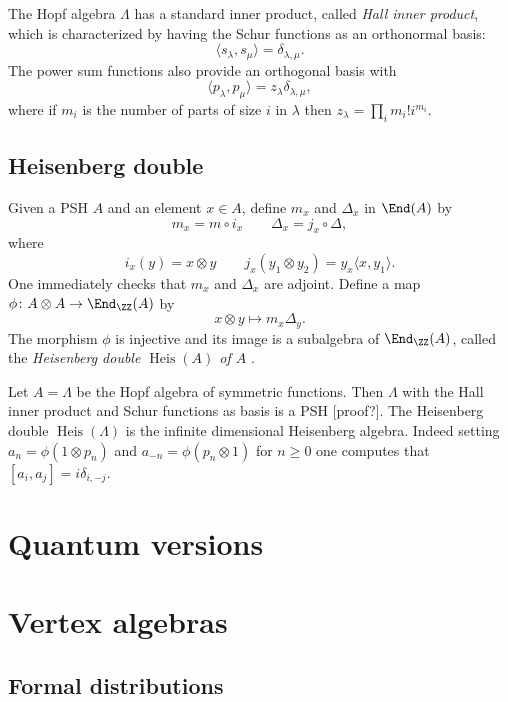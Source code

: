 \documentclass{ck-article}
\DeclareMathOperator\Heis{Heis}
\begin{document}
The Hopf algebra $\Lambda$ has a standard inner product, called \emph{Hall inner product}, which is characterized by having the Schur functions as an orthonormal basis:
\[
    \langle s_\lambda, s_\mu\rangle = \delta_{\lambda,\mu}.
\]
The power sum functions also provide an orthogonal basis with
\[
    \langle p_\lambda, p_\mu\rangle = z_\lambda\delta_{\lambda,\mu},
\]
where if $m_i$ is the number of parts of size $i$ in $\lambda$ then $z_\lambda = \prod_i m_i!i^{m_i}$.

\subsection{Heisenberg double}

Given a PSH $A$ and an element $x \in A$, define $m_x$ and $\Delta_x$ in $\End(A)$ by
\[
    m_x = m \circ i_x \qquad \Delta_x = j_x \circ \Delta,
\]
where
\[
    i_x(y) = x \otimes y \qquad j_x(y_1 \otimes y_2) = y_x \langle x, y_1 \rangle.
\]
One immediately checks that $m_x$ and $\Delta_x$ are adjoint.
Define a map $\phi\colon A \otimes A \to \End_\ZZ(A)$ by
\[
    x \otimes y \mapsto m_x\Delta_y.
\]
The morphism $\phi$ is injective and its image is a subalgebra of $\End_\ZZ(A)$, called the \emph{Heisenberg double $\Heis(A)$ of $A$} \cite[Proposition~5.4]{GalGal:2017:SymmetricSelfajointHopfCategories}.

\begin{Example}
    Let $A = \Lambda$ be the Hopf algebra of symmetric functions.
    Then $\Lambda$ with the Hall inner product and Schur functions as basis is a PSH [proof?].
    The Heisenberg double $\Heis(\Lambda)$ is the infinite dimensional Heisenberg algebra.
    Indeed setting $a_n = \phi(1 \otimes p_n)$ and $a_{-n} = \phi(p_n \otimes 1)$ for $n \ge 0$ one computes that $[a_i, a_j] = i\delta_{i,-j}$.
\end{Example}

\section{Quantum versions}

\section{Vertex algebras}

\subsection{Formal distributions}
\end{document}

